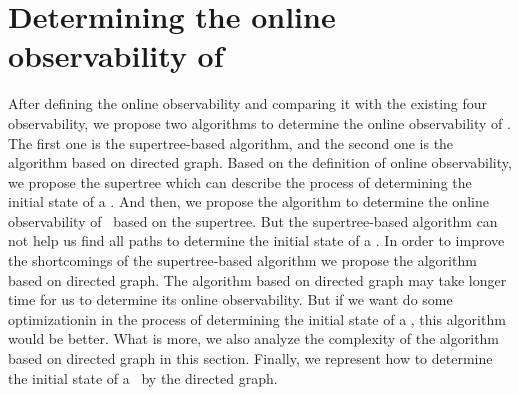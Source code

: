 \section{Determining the online observability of \BCNs}
\label{sec:deter}
After defining the online observability and comparing it with the existing four observability, we propose two algorithms to determine the online observability of \BCNs. The first one is the supertree-based algorithm, and the second one is the algorithm based on directed graph. Based on the definition of online observability, we propose the supertree which can describe the process of determining the initial state of a \BCN. And then, we propose the algorithm to determine the online observability of \BCNs\ based on the supertree. But the supertree-based algorithm can not help us find all paths to determine the initial state of a \BCN. In order to improve the shortcomings of the supertree-based algorithm we propose the algorithm based on directed graph. The algorithm based on directed graph may take longer time for us to determine its online observability. But if we want do some optimizationin in the process of determining the initial state of a \BCN, this algorithm would be better. What is more, we also analyze the complexity of the algorithm based on directed graph in this section. Finally, we represent how to determine the initial state of a \BCN\ by the directed graph.

